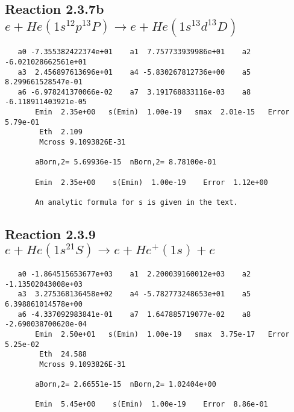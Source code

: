 \documentclass[12pt,dvipdfmx]{article}
\begin{document}
\newpage
\subsection{
Reaction 2.3.7b $e + He(1s^12p^13P) \rightarrow e + He(1s^13d^13D)$}

















\begin{small}\begin{verbatim}
   a0 -7.355382422374e+01    a1  7.757733939986e+01    a2 -6.021028662561e+01
   a3  2.456897613696e+01    a4 -5.830267812736e+00    a5  8.299661528547e-01
   a6 -6.978241370066e-02    a7  3.191768833116e-03    a8 -6.118911403921e-05
       Emin  2.35e+00   s(Emin)  1.00e-19   smax  2.01e-15   Error  5.79e-01
        Eth  2.109
        Mcross 9.1093826E-31

       aBorn,2= 5.69936e-15  nBorn,2= 8.78100e-01

       Emin  2.35e+00    s(Emin)  1.00e-19    Error  1.12e+00

       An analytic formula for s is given in the text.
\end{verbatim}\end{small}




\newpage
\subsection{
Reaction 2.3.9 $   e + He(1s^21S) \rightarrow e + He^+(1s) + e$}




\begin{small}\begin{verbatim}
   a0 -1.864515653677e+03    a1  2.200039160012e+03    a2 -1.13502043008e+03
   a3  3.275368136458e+02    a4 -5.782773248653e+01    a5  6.398861014578e+00
   a6 -4.337092983841e-01    a7  1.647885719077e-02    a8 -2.690038700620e-04
       Emin  2.50e+01   s(Emin)  1.00e-19   smax  3.75e-17   Error  5.25e-02
        Eth  24.588
        Mcross 9.1093826E-31

       aBorn,2= 2.66551e-15  nBorn,2= 1.02404e+00

       Emin  5.45e+00    s(Emin)  1.00e-19    Error  8.86e-01
\end{verbatim}\end{small}
\end{document}
